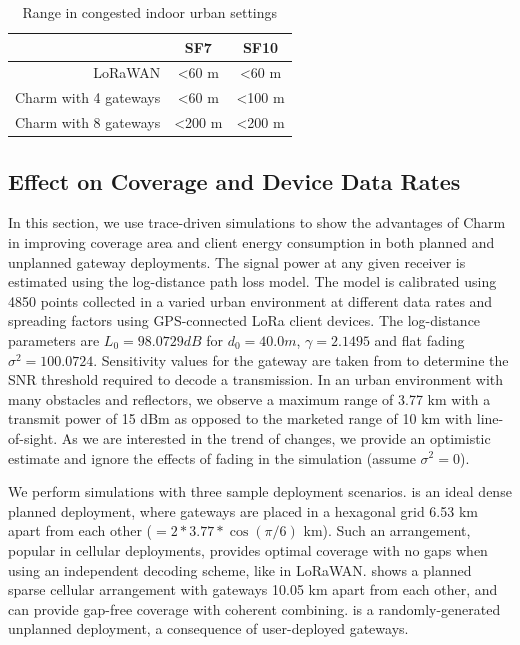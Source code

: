 \begin{table}[t]
\centering
\begin{tabular}{r|c|c|}
\cline{2-3}
\multicolumn{1}{l|}{}            & SF7            & SF10           \\ \hline
\multicolumn{1}{|r|}{LoRaWAN}       & \textless60 m  & \textless60 m  \\ \hline
\multicolumn{1}{|r|}{Charm with 4 gateways} & \textless60 m  & \textless100 m \\ \hline
\multicolumn{1}{|r|}{Charm with 8 gateways} & \textless200 m & \textless200 m \\ \hline
\end{tabular}
\caption{Range in congested indoor urban settings}
\label{tab:range}
\compactimg
\compactimg
\end{table}

\subsection{Effect on Coverage and Device Data Rates}
\label{sec:coverage-data-rate-improvement}

In this section, we use trace-driven simulations to show the advantages of
Charm in improving coverage area and client energy consumption in both planned
and unplanned gateway deployments. The signal power at any given receiver is
estimated using the log-distance path loss model. The model is calibrated
using 4850 points collected in a varied urban environment at different data
rates and spreading factors using GPS-connected LoRa client devices. The
log-distance parameters are $L_0  = 98.0729 dB$ for $d_0 = 40.0 m$, $\gamma =
2.1495$ and flat fading $\sigma^2 = 100.0724$. Sensitivity values for the
gateway are taken from \cite{Bor2016} to determine the SNR threshold required
to decode a transmission. In an urban environment with many obstacles and
reflectors, we observe a maximum range of 3.77 km with a transmit power of 15
dBm as opposed to the marketed range of 10 km with line-of-sight. As we are
interested in the trend of changes, we provide an optimistic estimate and
ignore the effects of fading in the simulation (assume $\sigma^2 = 0$).

We perform simulations with three sample deployment scenarios.
 is an ideal dense planned deployment, where gateways
are placed in a hexagonal grid 6.53 km apart from each other
($=2*3.77*\cos(\pi/6)$ km). Such an arrangement, popular in
cellular deployments, provides optimal coverage with no gaps when using an
independent decoding scheme, like in LoRaWAN. 
shows a planned sparse cellular arrangement with gateways 10.05 km apart from
each other, and can provide gap-free coverage with coherent combining.
 is a randomly-generated unplanned deployment, a
consequence of user-deployed gateways.

